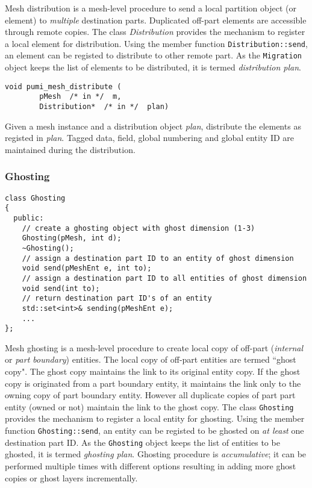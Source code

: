 Mesh distribution is a mesh-level procedure to send a local partition object (or element) to \emph{multiple} destination parts. Duplicated off-part elements are accessible through remote copies. The class \emph{Distribution} provides the mechanism to register a local element for distribution. Using the member function \texttt{Distribution::send}, an element can be registed to distribute to other remote part.  As the \texttt{Migration} object keeps the list of elements to be distributed, it is termed \emph{distribution plan}. 

\begin{verbatim}
void pumi_mesh_distribute (
        pMesh  /* in */  m,
        Distribution*  /* in */  plan)
\end{verbatim}\vspace{-.5cm}\hspace{1cm}
Given a mesh instance and a distribution object \emph{plan}, distribute the elements as registed in \emph{plan}. Tagged data, field, global numbering and global entity ID are maintained during the distribution.


\subsubsection{Ghosting}

\begin{verbatim}
class Ghosting
{
  public:
    // create a ghosting object with ghost dimension (1-3)
    Ghosting(pMesh, int d);
    ~Ghosting();
    // assign a destination part ID to an entity of ghost dimension
    void send(pMeshEnt e, int to);
    // assign a destination part ID to all entities of ghost dimension
    void send(int to);
    // return destination part ID's of an entity
    std::set<int>& sending(pMeshEnt e); 
    ...
};
\end{verbatim}\vspace{-.5cm}\hspace{1cm}

Mesh ghosting is a mesh-level procedure to create local copy of off-part (\emph{internal} or \emph{part boundary}) entities. The local copy of off-part entities are termed ``ghost copy". The ghost copy maintains the link to its original entity copy. If the ghost copy is originated from a part boundary entity, it maintains the link only to the owning copy of part boundary entity. However all duplicate copies of part part entity (owned or not) maintain the link to the ghost copy. The class \texttt{Ghosting} provides the mechanism to register a local entity for ghosting. Using the member function \texttt{Ghosting::send}, an entity can be registed to be ghosted on \emph{at least} one destination part ID.  As the \texttt{Ghosting} object keeps the list of entities to be ghosted, it is termed \emph{ghosting plan}. 
 Ghosting procedure is \emph{accumulative}; it can be performed multiple times with different options resulting in adding more ghost copies or ghost layers incrementally.

